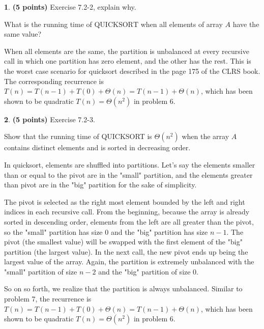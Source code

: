 \documentclass[11pt]{article}
\theoremstyle{definition}
\theoremstyle{theorem}
\newtheorem{prob}{}
\newcommand{\solution}{\medskip\noindent{\color{DarkBlue}\textbf{Solution:}}}
\begin{document}
\newpage
\begin{prob} \textbf{(5 points)} Exercise 7.2-2, explain why.

What is the running time of $\text{QUICKSORT}$ when all elements of array $A$ have the same value?

\solution

When all elements are the same, the partition is unbalanced at every recursive call in which one partition has zero element, and the other has the rest. This is the worst case scenario for quicksort described in the page 175 of the CLRS book. The corresponding recurrence is $T(n) = T(n-1) + T(0) + \Theta{(n)} = T(n-1) + \Theta{(n)}$, which has been shown to be quadratic $T(n) = \Theta{(n^2)}$ in problem 6.
\end{prob}

\newpage
\begin{prob} \textbf{(5 points)} Exercise 7.2-3.

Show that the running time of QUICKSORT is $\Theta{(n^2)}$ when the array $A$ contains distinct elements and is sorted in decreasing order.

\solution

In quicksort, elements are shuffled into partitions. Let's say the elements smaller than or equal to the pivot are in the "small" partition, and the elements greater than pivot are in the "big" partition for the sake of simplicity.

The pivot is selected as the right most element bounded by the left and right indices in each recursive call. From the beginning, because the array is already sorted in descending order, elements from the left are all greater than the pivot, so the "small" partition has size 0 and the "big" partition has size $n-1$. The pivot (the smallest value) will be swapped with the first element of the "big" partition (the largest value). In the next call, the new pivot ends up being the largest value of the array. Again, the partition is extremely unbalanced with the "small" partition of size $n-2$ and the "big" partition of size 0. 

So on so forth, we realize that the partition is always unbalanced. Similar to problem 7, the recurrence is $T(n) = T(n-1) + T(0) + \Theta{(n)} = T(n-1) + \Theta{(n)}$, which has been shown to be quadratic $T(n) = \Theta{(n^2)}$ in problem 6.
\end{prob}
\end{document}
